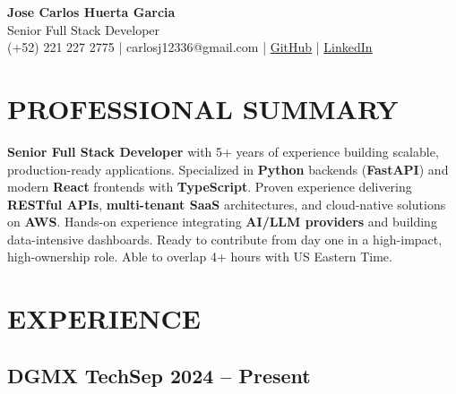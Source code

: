 \documentclass[a4paper,10pt]{article}
\newcommand{\kw}[1]{\textbf{\textcolor{keyword}{#1}}}
\newcommand{\tech}[1]{\textbf{\textcolor{tech}{#1}}}
\begin{document}
\begin{center}
{\bfseries\LARGE Jose Carlos Huerta Garcia} \\
Senior Full Stack Developer \\
(+52) 221 227 2775 | carlosj12336@gmail.com | \href{https://github.com/jcarloshg}{GitHub} | \href{https://www.linkedin.com/in/jose-carlos-huerta-garcia-773952212}{LinkedIn}
\end{center}

\section*{PROFESSIONAL SUMMARY}
\tech{Senior Full Stack Developer} with 5+ years of experience building scalable, production-ready applications. Specialized in \kw{Python} backends (\tech{FastAPI}) and modern \tech{React} frontends with \tech{TypeScript}. Proven experience delivering \kw{RESTful APIs}, \kw{multi-tenant SaaS} architectures, and cloud-native solutions on \tech{AWS}. Hands-on experience integrating \kw{AI/LLM providers} and building data-intensive dashboards. Ready to contribute from day one in a high-impact, high-ownership role. Able to overlap 4+ hours with US Eastern Time.

\section*{EXPERIENCE}

\subsection*{DGMX Tech\hfill\textbf{Sep 2024 -- Present}}
\end{document}
